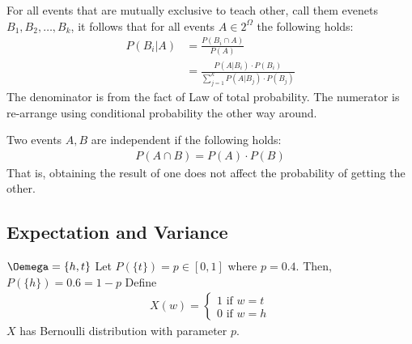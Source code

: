 \documentclass[a4paper]{article}
\theoremstyle{plain}
\newtheorem{thm}{Theorem}[section]
\theoremstyle{definition}
\newtheorem{defn}{Definition}[section]
\newtheorem{exmp}{Example}[section]
\theoremstyle{remark}
\begin{document}
\begin{tcolorbox}[colback=black!3!white,colframe=black!60!white,title=\begin{thm}Bayes' Theorem \label{Bayes' Theorem}\end{thm}]
	For all events that are mutually exclusive to teach other, call them evenets $B_1,B_2,\ldots,B_k$, it follows that for all events $A \in 2^{\Omega}$ the following holds:
		\begin{align}
			P(B_i |A ) &= \frac{P(B_i \cap A)}{P(A)} \\
				   &= \frac{P(A|B_i) \cdot P(B_i)}{\sum_{j=1}^{k} P(A|B_j) \cdot P(B_j)} 
		\end{align}
		The denominator is from the fact of Law of total probability. The numerator is re-arrange using conditional probability the other way around.
\end{tcolorbox}
\begin{tcolorbox}[colback=black!3!white,colframe=black!60!white,title=\begin{defn}Independence \label{Independence}\end{defn}]
Two events $A,B$ are independent if the following holds:
\begin{align}
	P(A \cap B) = P(A) \cdot P(B)
\end{align}
That is, obtaining the result of one does not affect the probability of getting the other.
\end{tcolorbox}
\subsection{Expectation and Variance}
\begin{tcolorbox}[colback=black!3!white,colframe=black!60!white,title=\begin{exmp}Bernoulli Trial \label{Bernoulli Trial}\end{exmp}]
$\Oemega = \{h,t\}$ 
Let $P(\{t \}) = p \in [0,1]$ where $p = 0.4$. 
Then, $P(\{h \} ) = 0.6 = 1 - p$ 
Define
                \begin{align}
                	X(w) =
			\begin{cases}
				1 \text{ if $w = t$}\\
				0  \text{ if $w = h$}
			\end{cases}
                \end{align}
		$X$ has Bernoulli distribution with parameter $p$. 
\end{tcolorbox}
\end{document}
